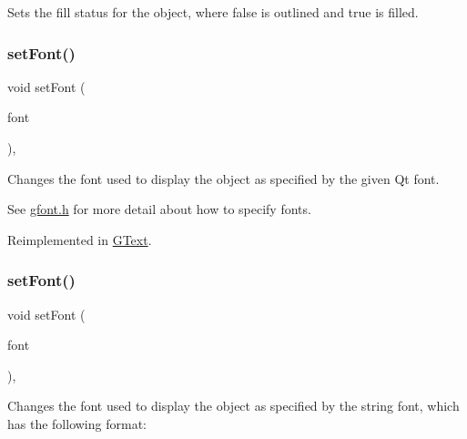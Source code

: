 Sets the fill status for the object, where {\ttfamily false} is outlined and {\ttfamily true} is filled. 

\mbox{\label{classGObject_a2592348886ffea646c6534bf88f7c49d}} 
\subsubsection{\texorpdfstring{set\+Font()}{setFont()}\hspace{0.1cm}{\footnotesize\ttfamily [1/2]}}
{\footnotesize\ttfamily void set\+Font (\begin{DoxyParamCaption}\item[{const Q\+Font \&}]{font }\end{DoxyParamCaption})\hspace{0.3cm}{\ttfamily [virtual]}, {\ttfamily [inherited]}}



Changes the font used to display the object as specified by the given Qt font. 

See \mbox{\hyperlink{gfont_8h_source}{gfont.\+h}} for more detail about how to specify fonts. 

Reimplemented in \mbox{\hyperlink{classGText_a2d22014c7fa3bccfd58c982aea1b55fa}{G\+Text}}.

\mbox{\label{classGObject_a8e096e8818d838aceae1d46d58fb3a7b}} 
\subsubsection{\texorpdfstring{set\+Font()}{setFont()}\hspace{0.1cm}{\footnotesize\ttfamily [2/2]}}
{\footnotesize\ttfamily void set\+Font (\begin{DoxyParamCaption}\item[{const std\+::string \&}]{font }\end{DoxyParamCaption})\hspace{0.3cm}{\ttfamily [virtual]}, {\ttfamily [inherited]}}



Changes the font used to display the object as specified by the string {\ttfamily font}, which has the following format\+: 


